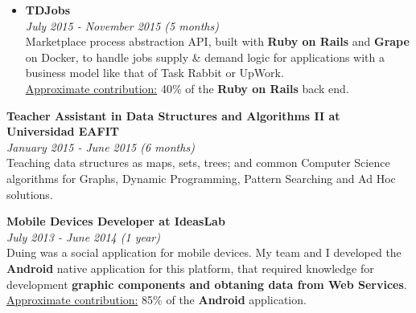 \documentclass[margin, 10pt]{res} %
\begin{document}
\begin{resume}
\begin{itemize}
  \item \textbf{TDJobs} \\
        \textit{July 2015 - November 2015 (5 months)} \\
        Marketplace process abstraction API, built with \textbf{Ruby on Rails} and \textbf{Grape} on
        Docker, to handle jobs supply \& demand logic for applications with a business model like
        that of Task Rabbit or UpWork. \\
        \underline{Approximate contribution:} 40\% of the \textbf{Ruby on Rails} back end. \\
\end{itemize}

\textbf{Teacher Assistant in Data Structures and Algorithms II at Universidad EAFIT} \\
\textit{January 2015 - June 2015 (6 months)} \\
Teaching data structures as maps, sets, trees; and common Computer Science algorithms for Graphs,
Dynamic Programming, Pattern Searching and Ad Hoc solutions.

\textbf{Mobile Devices Developer at IdeasLab} \\
\textit{July 2013 - June 2014 (1 year)} \\
Duing was a social application for mobile devices. My team and I developed the \textbf{Android}
native application for this platform, that required knowledge for development \textbf{graphic
components and obtaning data from Web Services}. \\
\underline{Approximate contribution:} 85\% of the \textbf{Android} application. \\


\end{resume}
\end{document}
